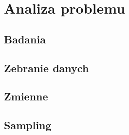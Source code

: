 

\section{Analiza problemu}

\subsection{Badania}

\subsection{Zebranie danych}

\subsection{Zmienne}

\subsection{Sampling}

